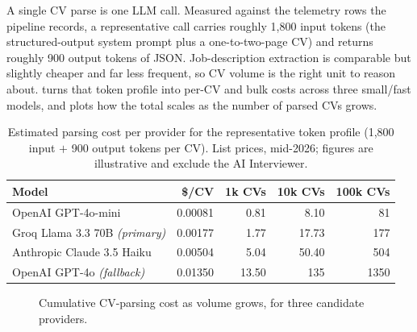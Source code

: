 A single CV parse is one LLM call. Measured against the telemetry rows the
pipeline records, a representative call carries roughly 1{,}800 input
tokens (the structured-output system prompt plus a one-to-two-page CV) and
returns roughly 900 output tokens of JSON. Job-description extraction is
comparable but slightly cheaper and far less frequent, so CV volume is the
right unit to reason about.  turns that token profile
into per-CV and bulk costs across three small/fast models, and
 plots how the total scales as the number of parsed
CVs grows.

\begin{table}[ht]
\centering
\caption[Estimated parsing cost per provider]{Estimated parsing cost per
provider for the representative token profile (1{,}800 input $+$ 900
output tokens per CV). List prices, mid-2026; figures are illustrative and
exclude the AI Interviewer.}
\label{tab:parse-cost}
\begin{tabular}{lrrrr}
\toprule
\textbf{Model} & \textbf{\$/CV} & \textbf{1k CVs} & \textbf{10k CVs} & \textbf{100k CVs} \\
\midrule
OpenAI GPT-4o-mini & 0.00081 & 0.81 & 8.10 & 81 \\
Groq Llama 3.3 70B \textit{(primary)} & 0.00177 & 1.77 & 17.73 & 177 \\
Anthropic Claude 3.5 Haiku & 0.00504 & 5.04 & 50.40 & 504 \\
OpenAI GPT-4o \textit{(fallback)} & 0.01350 & 13.50 & 135 & 1350 \\
\bottomrule
\end{tabular}
\end{table}

\begin{figure}[ht]
\centering
{}
\caption[Parsing cost scaling]{Cumulative CV-parsing cost as volume grows, for
three candidate providers.}
\label{fig:parse-cost}
\end{figure}

